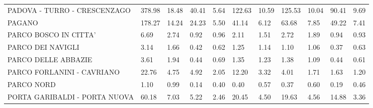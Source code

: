 \begin{table}[H]
{{\begin{tabular}{lp{1.3cm}p{1.3cm}p{1.3cm}p{1.3cm}p{1.3cm}p{1.3cm}p{1.3cm}p{1.3cm}p{1.3cm}p{1.3cm}}
PADOVA - TURRO - CRESCENZAGO                       &                    378.98 &                 18.48 &                       40.41 &                    5.64 &                      122.63 &                   10.59 &                      125.53 &                   10.04 &                     90.41 &                  9.69 \\
PAGANO                                             &                    178.27 &                 14.24 &                       24.23 &                    5.50 &                       41.14 &                    6.12 &                       63.68 &                    7.85 &                     49.22 &                  7.41 \\
PARCO BOSCO IN CITTA'                              &                      6.69 &                  2.74 &                        0.92 &                    0.96 &                        2.11 &                    1.51 &                        2.72 &                    1.89 &                      0.94 &                  0.93 \\
PARCO DEI NAVIGLI                                  &                      3.14 &                  1.66 &                        0.42 &                    0.62 &                        1.25 &                    1.14 &                        1.10 &                    1.06 &                      0.37 &                  0.63 \\
PARCO DELLE ABBAZIE                                &                      3.61 &                  1.94 &                        0.44 &                    0.69 &                        1.35 &                    1.23 &                        1.38 &                    1.09 &                      0.44 &                  0.61 \\
PARCO FORLANINI - CAVRIANO                         &                     22.76 &                  4.75 &                        4.92 &                    2.05 &                       12.20 &                    3.32 &                        4.01 &                    1.71 &                      1.63 &                  1.20 \\
PARCO NORD                                         &                      1.10 &                  0.99 &                        0.14 &                    0.40 &                        0.40 &                    0.57 &                        0.37 &                    0.60 &                      0.19 &                  0.46 \\
PORTA GARIBALDI - PORTA NUOVA                      &                     60.18 &                  7.03 &                        5.22 &                    2.46 &                       20.45 &                    4.50 &                       19.63 &                    4.56 &                     14.88 &                  3.36 \\

\end{tabular}}}
\end{table}
